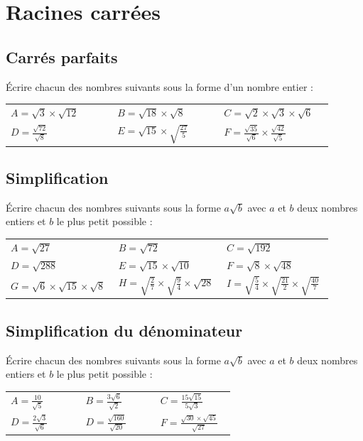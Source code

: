 \documentclass[oneside,12pt]{article}          %
\begin{document}
\section{Racines carrées}

\subsection{Carrés parfaits}
Écrire chacun des nombres suivants sous la forme d'un nombre entier :

\renewcommand{\arraystretch}{1.5}
\begin{tabular}{p{0.3\linewidth} p{0.3\linewidth} p{0.3\linewidth}}
    $A=\sqrt{3}\times\sqrt{12}$ & $B=\sqrt{18}\times \sqrt{8}$ & $C=\sqrt{2}\times\sqrt{3}\times\sqrt{6}$ \\
    $D=\frac{\sqrt{72}}{\sqrt{8}}$ & $E=\sqrt{15}\times\sqrt{\frac{27}{5}}$ & $F=\frac{\sqrt{35}}{\sqrt{6}}\times\frac{\sqrt{42}}{\sqrt{5}}$
\end{tabular}



\subsection{Simplification}
Écrire chacun des nombres suivants sous la forme $a\sqrt{b}$ avec $a$ et $b$ deux nombres entiers et $b$ le plus petit possible :

\renewcommand{\arraystretch}{1.5}
\begin{tabular}{p{0.3\linewidth} p{0.3\linewidth} p{0.3\linewidth}}
    $A=\sqrt{27}$ & $B=\sqrt{72}$ & $C=\sqrt{192}$ \\
    $D=\sqrt{288}$ & $E=\sqrt{15}\times\sqrt{10}$ & $F=\sqrt{8}\times\sqrt{48}$ \\
    $G=\sqrt{6}\times\sqrt{15}\times\sqrt{8}$ & $ H=\sqrt{\frac{2}{7}}\times\sqrt{\frac{9}{4}}\times\sqrt{28}$ & $I=\sqrt{\frac{5}{4}}\times\sqrt{\frac{21}{2}}\times\sqrt{\frac{40}{7}}$
\end{tabular}



\subsection{Simplification du dénominateur}
Écrire chacun des nombres suivants sous la forme $a\sqrt{b}$ avec $a$ et $b$ deux nombres entiers et $b$ le plus petit possible :

\renewcommand{\arraystretch}{2}
\begin{tabular}{p{0.3\linewidth} p{0.3\linewidth} p{0.3\linewidth}}
    $A=\frac{10}{\sqrt{5}}$ & $B=\frac{3\sqrt{6}}{\sqrt{2}}$ & $C=\frac{15\sqrt{15}}{5\sqrt{3}}$ \\
    $D=\frac{2\sqrt{3}}{\sqrt{6}}$ & $D=\frac{\sqrt{160}}{\sqrt{20}}$ & $F=\frac{\sqrt{30}\times\sqrt{45}}{\sqrt{27}}$
\end{tabular}
\end{document}
